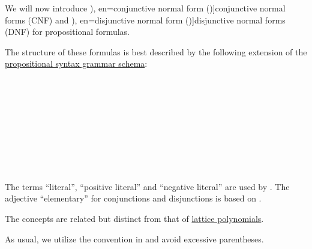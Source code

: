 \begin{definition}\label{def:cnf_and_dnf}\mimprovised
  We will now introduce \term[ru=конъюнктивная нормальная форма (\cite[def. 6.2]{Эдельман1975}), en=conjunctive normal form (\cite[def. 1.3.10]{Hinman2005})]{conjunctive normal forms} (CNF) and \term[ru=дизъюнктивная нормальная форма (\cite[def. 6.2]{Эдельман1975}), en=disjunctive normal form (\cite[def. 1.3.10]{Hinman2005})]{disjunctive normal forms} (DNF) for propositional formulas.

  The structure of these formulas is best described by the following extension of the \hyperref[def:propositional_syntax/grammar_schema]{propositional syntax grammar schema}:
  \begin{bnf*}
           {} \\
           {\synneg {}} \\
                    {       \bnfor {}} \\
     { \bnfor} \\
     \\
                        { \bnfor \bnftsq{(} \bnfsp {}              \bnfsp \bnftsq{\( \synwedge \)} \bnfsp {}             \bnfsp \bnftsq{)}} \\
     { \bnfor} \\
     \\
                        { \bnfor \bnftsq{(} \bnfsp {}              \bnfsp \bnftsq{\( \synvee \)}   \bnfsp {}             \bnfsp \bnftsq{)}}
  \end{bnf*}
\end{definition}
\begin{comments}
  \item The terms \enquote{literal}, \enquote{positive literal} and \enquote{negative literal} are used by . The adjective \enquote{elementary} for conjunctions and disjunctions is based on \cite[36]{Эдельман1975}.
  \item The concepts are related but distinct from that of \hyperref[rem:lattice_polynomials]{lattice polynomials}.
  \item As usual, we utilize the convention in  and avoid excessive parentheses.
\end{comments}

